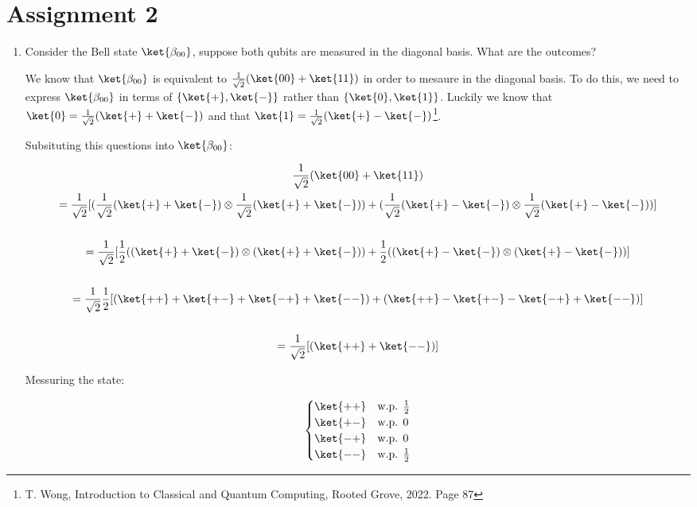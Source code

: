 \documentclass[]{article}
\begin{document}
  \section*{Assignment 2}
    \begin{enumerate}
      \item Consider the Bell state $\ket{\beta_{00}}$, suppose both qubits are measured in the diagonal basis. 
        What are the outcomes?

        We know that $\ket{\beta_{00}}$ is equivalent to $\frac{1}{\sqrt{2}}(\ket{00} + \ket{11})$ in order 
        to mesaure in the diagonal basis. To do this, we need to express $\ket{\beta_{00}}$ 
        in terms of $\{\ket{+}, \ket{-}\}$ rather than $\{\ket{0}, \ket{1}\}$.
        Luckily we know that $\ket{0} = \frac{1}{\sqrt{2}}(\ket{+} + \ket{-})$ and that
        $\ket{1} = \frac{1}{\sqrt{2}}(\ket{+} - \ket{-})$\footnote{T. Wong, Introduction to 
        Classical and Quantum Computing, Rooted Grove, 2022. Page 87}. 

        Subsituting this questions into $\ket{\beta_{00}}$:

        \begin{gather*}
          \frac{1}{\sqrt{2}}(\ket{00} + \ket{11}) \\
          = \frac{1}{\sqrt{2}}[(\frac{1}{\sqrt{2}}(\ket{+} + \ket{-}) \otimes \frac{1}{\sqrt{2}}(\ket{+} + \ket{-}))
          + (\frac{1}{\sqrt{2}}(\ket{+} - \ket{-}) \otimes \frac{1}{\sqrt{2}}(\ket{+} - \ket{-}))] \\
          \\
          = \frac{1}{\sqrt{2}}[\frac{1}{2}((\ket{+} + \ket{-}) \otimes (\ket{+} + \ket{-}))
          + \frac{1}{2}((\ket{+} - \ket{-}) \otimes (\ket{+} - \ket{-}))] \\
          \\
          = \frac{1}{\sqrt{2}}\frac{1}{2}[(\ket{++} + \ket{+-} + \ket{-+} + \ket{--})
          + (\ket{++} - \ket{+-} - \ket{-+} + \ket{--})] \\
          \\
          = \frac{1}{\sqrt{2}}[(\ket{++} + \ket{--})] \\
        \end{gather*}

        Messuring the state:

        \[
          \begin{cases}
            \ket{++} & \text{w.p. } \frac{1}{2} \\
            \ket{+-} & \text{w.p. } 0\\
            \ket{-+} & \text{w.p. } 0 \\
            \ket{--} & \text{w.p. } \frac{1}{2} \\
          \end{cases}
        \]


\end{enumerate}
\end{document}
